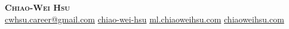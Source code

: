 
\begin{center}
  \textbf{\Huge \scshape Chiao-Wei Hsu} \\ 
  \vspace{5pt plus 2pt minus 2pt} \small \faPhone\hspace{1pt}  
  \hspace{10pt} \faEnvelope\hspace{2pt}\href{mailto:cwhsu.career@gmail.com} {cwhsu.career@gmail.com}
  \hspace{10pt} \faLinkedin\hspace{2pt}\href{https://linkedin.com/in/chiao-wei-hsu}{chiao-wei-hsu}
  \ifML
    \hspace{10pt} \faGlobe\hspace{2pt}\href{https://ml.chiaoweihsu.com}{ml.chiaoweihsu.com}
  \else
    \hspace{10pt} \faGlobe\hspace{2pt}\href{https://chiaoweihsu.com}{chiaoweihsu.com}
  \fi
\end{center}
